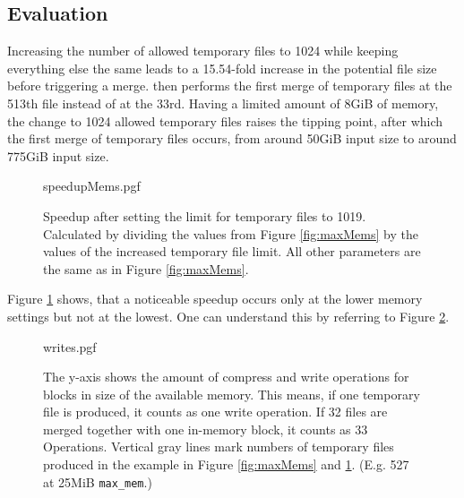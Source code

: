 \subsection{Evaluation}
Increasing the number of allowed temporary files to 1024 while keeping everything else the same leads to a 15.54-fold increase in the potential file size before triggering a merge. \sort then performs the first merge of temporary files at the 513th file instead of at the 33rd. Having a limited amount of 8GiB of memory, the change to 1024 allowed temporary files raises the tipping point, after which the first merge of temporary files occurs, from around 50GiB input size to around 775GiB input size.\\
\begin{figure}
        {speedupMems.pgf}
    \caption{Speedup after setting the limit for temporary files to 1019. Calculated by dividing the values from Figure \ref{fig:maxMems} by the values of the increased temporary file limit. All other parameters are the same as in Figure \ref{fig:maxMems}.}
    \label{fig:memSpeedup}
\end{figure}
Figure \ref{fig:memSpeedup} shows, that a noticeable speedup occurs only at the lower memory settings but not at the lowest. One can understand this by referring to Figure \ref{fig:writes}.
\begin{figure}
        {writes.pgf}
    \caption{
    The y-axis shows the amount of compress and write operations for blocks in size of the available memory. This means, if one temporary file is produced, it counts as one write operation. If 32 files are merged together with one in-memory block, it counts as 33 Operations. Vertical gray lines mark numbers of temporary files produced in the example in Figure \ref{fig:maxMems} and \ref{fig:memSpeedup}. (E.g. 527 at 25MiB \texttt{max\_mem}.)
    }
    \label{fig:writes}
\end{figure}